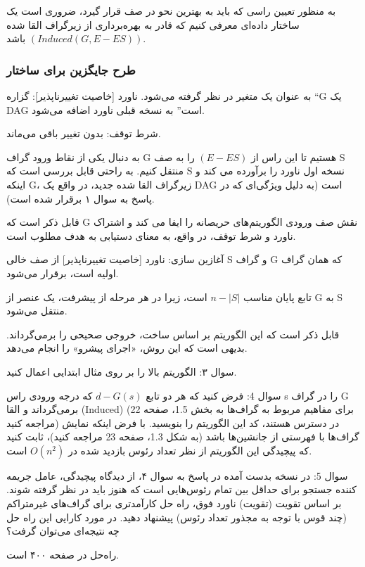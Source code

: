 \documentclass{book} %
\begin{document}
به منظور تعیین راسی که باید به بهترین نحو در صف قرار گیرد، ضروری است یک ساختار
داده‌ای معرفی کنیم که قادر به بهره‌برداری از زیرگراف القا شده $(Induced(G, E − ES ))$ باشد.

\subsubsection*{طرح جایگزین برای ساختار}
به عنوان یک متغیر در نظر گرفته می‌شود.
ناورد [خاصیت تغییرناپذیر]: گزاره “G یک DAG است” به نسخه قبلی ناورد اضافه می‌شود.

شرط توقف: بدون تغییر باقی می‌ماند.

به دنبال یکی از نقاط ورود گراف G هستیم تا این راس از $(E − ES )$ را به صف S منتقل کنیم.
به راحتی قابل بررسی است که S نسخه اول ناورد را برآورده می کند و اینکه G، زیرگراف القا
شده جدید، در واقع یک DAG است (به دلیل ویژگی‌ای که در پاسخ به سوال ۱ برقرار شده است).

قابل ذکر است که G نقش صف ورودی الگوریتم‌های حریصانه را ایفا می کند و اشتراک ناورد و
شرط توقف، در واقع، به معنای دستیابی به هدف مطلوب است.

آغازین سازی: ناورد [خاصیت تغییرناپذیر] از صف خالی S
و گراف G که همان گراف اولیه است، برقرار می‌شود.

تابع پایان مناسب $n−|S|$ است، زیرا در هر مرحله از پیشرفت، یک عنصر از G به S منتقل می‌شود.

قابل ذکر است که این الگوریتم بر اساس ساخت، خروجی صحیحی را برمی‌گرداند. بدیهی است که این روش، «اجرای پیشرو» را انجام می‌دهد.

سوال ۳: الگوریتم بالا را بر روی مثال ابتدایی اعمال کنید.


سوال 4: فرض کنید که هر دو تابع $d−G(s)$ که درجه ورودی راس s را در گراف G برمی‌گرداند
و القا (Induced) (برای مفاهیم مربوط به گراف‌ها به بخش 1.5، صفحه 22 مراجعه کنید) در دسترس هستند،
کد این الگوریتم را بنویسید. با فرض اینکه نمایش گراف‌ها با فهرستی از جانشین‌ها باشد
(به شکل 1.3، صفحه 23 مراجعه کنید)، ثابت کنید که پیچیدگی این الگوریتم از نظر تعداد رئوس بازدید شده
در $O(n^2)$ است.

سوال 5: در نسخه بدست آمده در پاسخ به سوال ۴، از دیدگاه پیچیدگی، عامل جریمه کننده
جستجو برای حداقل بین تمام رئوس‌هایی است که هنوز باید در نظر گرفته شوند. بر اساس تقویت (تقویت) ناورد فوق، راه حل کارآمدتری برای گراف‌های غیرمتراکم (چند قوس با توجه به مجذور تعداد رئوس) پیشنهاد دهید. در مورد کارایی
این راه حل چه نتیجه‌ای می‌توان گرفت؟

راه‌حل در صفحه ۴۰۰ است.
\end{document}
